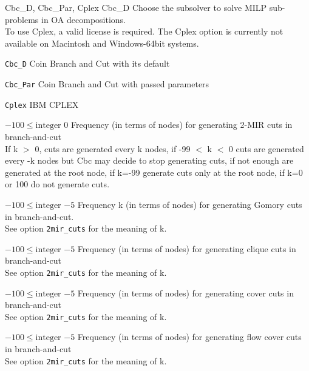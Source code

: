 %
{Cbc\_D, Cbc\_Par, Cplex}%
{Cbc\_D}%
{Choose the subsolver to solve MILP sub-problems in OA decompositions.\\
 To use Cplex, a valid license is required. The Cplex option is currently not available on Macintosh and Windows-64bit systems.}%
{\begin{list}{}{
\setlength{\parsep}{0em}
\setlength{\leftmargin}{5ex}
\setlength{\labelwidth}{2ex}
\setlength{\itemindent}{0ex}
\setlength{\topsep}{0pt}}
\item[\texttt{Cbc\_D}] Coin Branch and Cut with its default
\item[\texttt{Cbc\_Par}] Coin Branch and Cut with passed parameters
\item[\texttt{Cplex}] IBM CPLEX
\end{list}
}

%
{$-100\leq\textrm{integer}$}%
{$0$}%
{Frequency (in terms of nodes) for generating 2-MIR cuts in branch-and-cut\\
If k $>$ 0, cuts are generated every k nodes, if -99 $<$ k $<$ 0 cuts are generated every -k nodes but Cbc may decide to stop generating cuts, if not enough are generated at the root node, if k=-99 generate cuts only at the root node, if k=0 or 100 do not generate cuts.}%
{}

%
{$-100\leq\textrm{integer}$}%
{$-5$}%
{Frequency k (in terms of nodes) for generating Gomory cuts in branch-and-cut.\\
See option \texttt{2mir\_cuts} for the meaning of k.}%
{}

%
{$-100\leq\textrm{integer}$}%
{$-5$}%
{Frequency (in terms of nodes) for generating clique cuts in branch-and-cut\\
See option \texttt{2mir\_cuts} for the meaning of k.}%
{}

%
{$-100\leq\textrm{integer}$}%
{$-5$}%
{Frequency (in terms of nodes) for generating cover cuts in branch-and-cut\\
See option \texttt{2mir\_cuts} for the meaning of k.}%
{}

%
{$-100\leq\textrm{integer}$}%
{$-5$}%
{Frequency (in terms of nodes) for generating flow cover cuts in branch-and-cut\\
See option \texttt{2mir\_cuts} for the meaning of k.}%
{}

